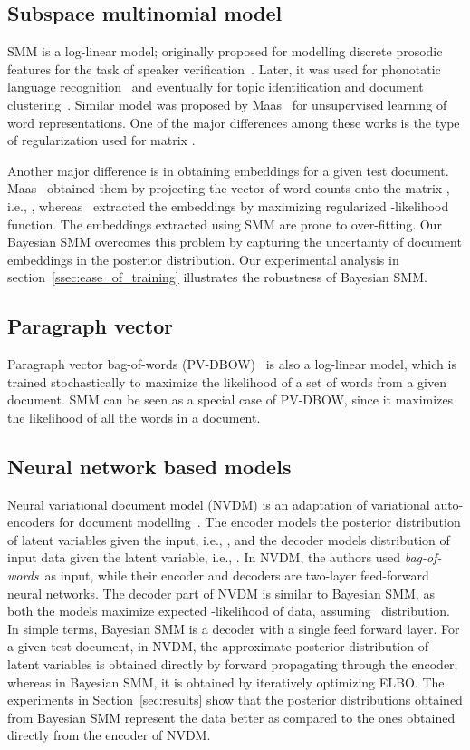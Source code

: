 \documentclass[journal]{IEEEtran}
\newcommand{\Mul}{}
\newcommand{\bow}{\textit{bag-of-words}}
\begin{document}
\subsection{Subspace multinomial model}
\label{ssec_smm}
SMM is a log-linear model; originally proposed for modelling discrete prosodic 
features for the task of speaker verification~\cite{Marcel:2010:SMM}. Later, it 
was used for phonotatic language recognition~\cite{Mehdi:2011:SMM} and 
eventually for topic identification and document 
clustering~\cite{May:2015:mivec,Kesiraju:2016:SMM}. Similar model was proposed 
by Maas~\cite{Maas:2011:Sent} for unsupervised learning of word 
representations. One of the major differences among these works is the type of 
regularization used for matrix .

Another major difference is in obtaining embeddings  for a given test document. Maas~\cite{Maas:2011:Sent} obtained them by projecting the vector of word counts  onto the matrix , i.e., , whereas~\cite{May:2015:mivec,Kesiraju:2016:SMM} extracted the embeddings by maximizing regularized -likelihood function.
The embeddings extracted using SMM are prone to over-fitting. Our Bayesian SMM 
overcomes this problem by capturing the uncertainty of document embeddings in 
the posterior distribution. Our experimental analysis in 
section~\ref{ssec:ease_of_training} illustrates the robustness of Bayesian SMM.

\subsection{Paragraph vector}
\label{ssec:pvec}
Paragraph vector bag-of-words (PV-DBOW)~\cite{Quoc:2014:PV} is also a 
log-linear model, which is trained stochastically to maximize the likelihood of 
a set of words from a given document. SMM can be seen as a special case of 
PV-DBOW, since it maximizes the likelihood of all the words in a document.

\subsection{Neural network based models}
\label{ssec:nvdm}
Neural variational document model (NVDM) is an adaptation of variational auto-encoders for document modelling~\cite{NVI:2016}. The encoder models the posterior distribution of latent variables given the input, i.e., , and the decoder models distribution of input data given the latent variable, i.e., .  In NVDM, the authors used \bow~as input, while their encoder and decoders are two-layer feed-forward neural networks. The decoder part of NVDM is similar to Bayesian SMM, as both the models maximize expected -likelihood of data, assuming \Mul~distribution. In simple terms, Bayesian SMM is a decoder with a single feed forward layer. For a given test document, in NVDM, the approximate posterior distribution of latent variables is obtained directly by forward propagating through the encoder; whereas in Bayesian SMM, it is obtained by iteratively optimizing ELBO.
The experiments in Section~\ref{sec:results} show that the posterior distributions obtained from Bayesian SMM represent the data better as compared to the ones obtained directly from the encoder of NVDM. 
\end{document}
